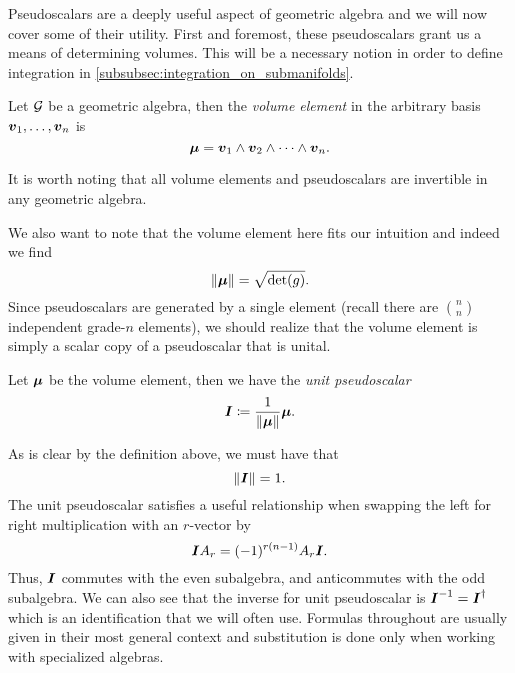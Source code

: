 Pseudoscalars are a deeply useful aspect of geometric algebra and we will now cover some of their utility. First and foremost, these pseudoscalars grant us a means of determining volumes. This will be a necessary notion in order to define integration in \cref{subsubsec:integration_on_submanifolds}.
\begin{definition}
Let $\mathcal{G}$ be a geometric algebra, then the \emph{volume element} in the arbitrary basis $\boldsymbol{v}_1,\dots,\boldsymbol{v}_n$ is 
\begin{equation}
\boldsymbol{\mu}=\boldsymbol{v}_1 \wedge \boldsymbol{v}_2 \wedge \cdots \wedge \boldsymbol{v}_n.
\end{equation}
\end{definition}
It is worth noting that all volume elements and pseudoscalars are invertible in any geometric algebra. 

We also want to note that the volume element here fits our intuition and indeed we find
\begin{equation}
\label{eq:pseudoscalar_norm}
\|\boldsymbol{\mu}\| = \sqrt{\det(g)}.
\end{equation}
Since pseudoscalars are generated by a single element (recall there are ${n \choose n}$ independent grade-$n$ elements), we should realize that the volume element is simply a scalar copy of a pseudoscalar that is unital.
\begin{definition}
Let $\boldsymbol{\mu}$ be the volume element, then we have the \emph{unit pseudoscalar}
\begin{equation}
\boldsymbol{I} \coloneqq \frac{1}{\|\boldsymbol{\mu}\|} \boldsymbol{\mu}.
\end{equation}
\end{definition}
As is clear by the definition above, we must have that
\begin{equation}
\|\boldsymbol{I}\| = 1.
\end{equation}
The unit pseudoscalar satisfies a useful relationship when swapping the left for right multiplication with an $r$-vector by
\begin{equation}
\boldsymbol{I} A_r = (-1)^{r(n-1)} A_r \boldsymbol{I}.
\end{equation}
Thus, $\boldsymbol{I}$ commutes with the even subalgebra, and anticommutes with the odd subalgebra. We can also see that the inverse for unit pseudoscalar is $\boldsymbol{I}^{-1}=\boldsymbol{I}^\dagger$ which is an identification that we will often use. Formulas throughout are usually given in their most general context and substitution is done only when working with specialized algebras.  

